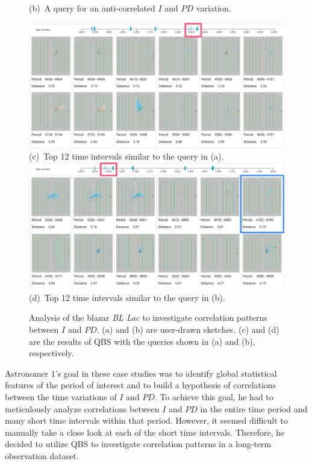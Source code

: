 \begin{figure}[tb]
\begin{minipage}{0.49\linewidth}
        \footnotesize{\sf(b)~A query for an anti-correlated $I$ and $PD$ variation.}\\
    \end{minipage}
    \includegraphics[width=.99\linewidth]{vgtc_journal_latex/figures/correlateResultsLabel14.png}\\
    \footnotesize{\sf(c)~Top 12 time intervals similar to the query in (a).}\\
    \includegraphics[width=.99\linewidth]{vgtc_journal_latex/figures/anticorrelateResultsLabel14.png}\\
    \footnotesize{\sf(d)~Top 12 time intervals similar to the query in (b).}
    \caption{Analysis of the blazar \emph{BL Lac} to investigate correlation patterns between $I$ and $PD$. (a) and (b) are user-drawn sketches. (c) and (d) are the results of QBS with the queries shown in (a) and (b), respectively.}
    \label{fig:EvaluationQueryResults}
\end{figure}
%
Astronomer 1's goal in these case studies was to identify global statistical features of the period of interest and to build a hypothesis of correlations between the time variations of $I$ and $PD$.
To achieve this goal, he had to meticulously analyze correlations between $I$ and $PD$ in the entire time period and many short time intervals within that period.
However, it seemed difficult to manually take a close look at each of the short time intervals.
Therefore, he decided to utilize QBS to investigate correlation patterns in a long-term observation dataset.

